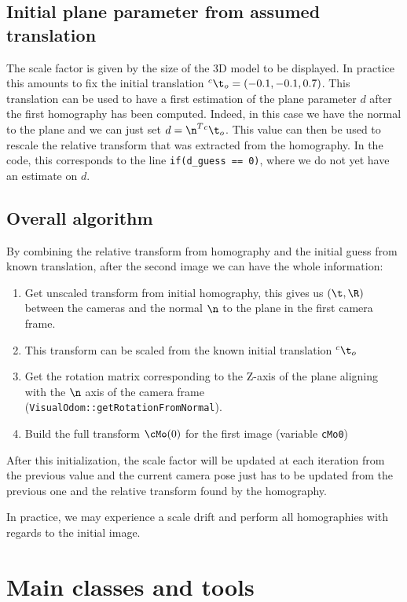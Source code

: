\documentclass{ecnreport}
\begin{document}
\subsection{Initial plane parameter from assumed translation}
\label{sec:init}

The scale factor is given by the size of the 3D model to be displayed. In practice this amounts to fix the initial translation ${}^c\t_o = (-0.1,-0.1,0.7)$.
This translation can be used to have a first estimation of the plane parameter $d$ after the first homography has been computed.
Indeed, in this case we have the normal to the plane and we can just set $d = \n^T{}^c\t_o$. This value can then be used to rescale the relative transform 
that was extracted from the homography. 
In the code, this corresponds to the line \texttt{if(d\_guess == 0)}, where we do not yet have an estimate on $d$.

\subsection{Overall algorithm}

By combining the relative transform from homography and the initial guess from known translation, after the second image we can have the whole information:
\begin{enumerate}
 \item Get unscaled transform from initial homography, this gives us $(\t,\R)$ between the cameras and the normal $\n$ to the plane in the first camera frame.
 \item This transform can be scaled from the known initial translation ${}^c\t_o$
 \item Get the rotation matrix corresponding to the Z-axis of the plane aligning with the $\n$ axis of the camera frame (\texttt{VisualOdom::getRotationFromNormal}). 
 \item Build the full transform $\cMo(0)$ for the first image (variable \texttt{cMo0})
\end{enumerate}

After this initialization, the scale factor will be updated at each iteration from the previous value and the current camera pose just has to be updated from the previous one and the relative
transform found by the homography.

In practice, we may experience a scale drift and perform all homographies with regards to the initial image.


\appendix
\section{Main classes and tools}\label{sec:classes}
\end{document}
